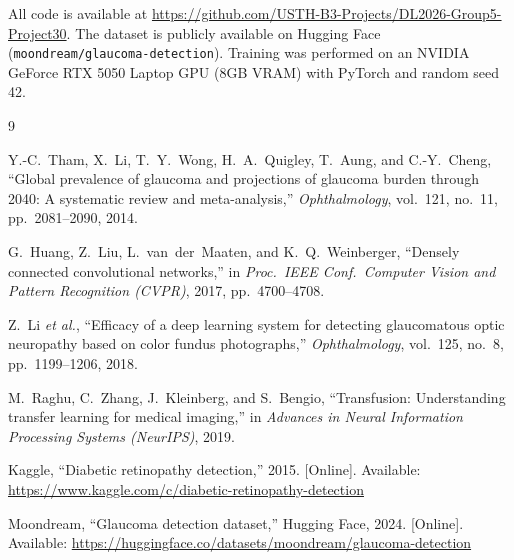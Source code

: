 \documentclass[conference]{IEEEtran}
\begin{document}
All code is available at \url{https://github.com/USTH-B3-Projects/DL2026-Group5-Project30}.
The dataset is publicly available on Hugging Face (\texttt{moondream/glaucoma-detection}).
Training was performed on an NVIDIA GeForce RTX 5050 Laptop GPU (8GB VRAM) with PyTorch and random seed 42.

\begin{thebibliography}{9}

Y.-C.~Tham, X.~Li, T.~Y.~Wong, H.~A.~Quigley, T.~Aung, and C.-Y.~Cheng,
``Global prevalence of glaucoma and projections of glaucoma burden through 2040: A systematic review and meta-analysis,''
\textit{Ophthalmology}, vol.~121, no.~11, pp.~2081--2090, 2014.

G.~Huang, Z.~Liu, L.~van~der~Maaten, and K.~Q.~Weinberger,
``Densely connected convolutional networks,''
in \textit{Proc.\ IEEE Conf.\ Computer Vision and Pattern Recognition (CVPR)}, 2017, pp.~4700--4708.

Z.~Li \textit{et al.},
``Efficacy of a deep learning system for detecting glaucomatous optic neuropathy based on color fundus photographs,''
\textit{Ophthalmology}, vol.~125, no.~8, pp.~1199--1206, 2018.

M.~Raghu, C.~Zhang, J.~Kleinberg, and S.~Bengio,
``Transfusion: Understanding transfer learning for medical imaging,''
in \textit{Advances in Neural Information Processing Systems (NeurIPS)}, 2019.

Kaggle,
``Diabetic retinopathy detection,''
2015. [Online]. Available: \url{https://www.kaggle.com/c/diabetic-retinopathy-detection}

Moondream,
``Glaucoma detection dataset,''
Hugging Face, 2024. [Online]. Available: \url{https://huggingface.co/datasets/moondream/glaucoma-detection}

\end{thebibliography}
\end{document}
